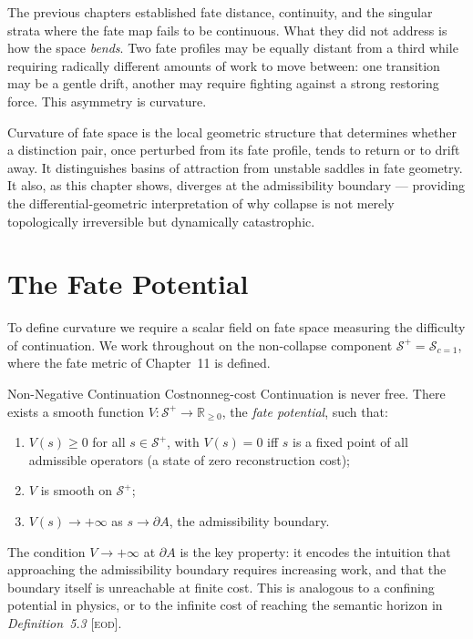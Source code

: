 \documentclass[12pt,twoside,openright]{book}
\newcommand{\fateSpace}{\mathcal{S}}
\newcommand{\collapseInd}{c}             %
\newcommand{\EOD}[1]{\textit{#1} [\textsc{eod}]}
\newcommand{\admRegion}{A}
\newcommand{\fateComp}[1]{\fateSpace_{\collapseInd=#1}}
\providecommand{\fatePos}{\fateSpace^{+}}
\providecommand{\fateComp}[1]{\fateSpace_{\collapseInd=#1}}
\providecommand{\admRegion}{A}
\providecommand{\fatePot}{V}
\begin{document}
The previous chapters established fate distance, continuity,
and the singular strata where the fate map fails to be
continuous. What they did not address is how the space
\emph{bends}. Two fate profiles may be equally distant from
a third while requiring radically different amounts of work
to move between: one transition may be a gentle drift, another
may require fighting against a strong restoring force. This
asymmetry is curvature.

Curvature of fate space is the local geometric structure that
determines whether a distinction pair, once perturbed from its
fate profile, tends to return or to drift away. It distinguishes
basins of attraction from unstable saddles in fate geometry.
It also, as this chapter shows, diverges at the admissibility
boundary --- providing the differential-geometric interpretation
of why collapse is not merely topologically irreversible but
dynamically catastrophic.

\section{The Fate Potential}

To define curvature we require a scalar field on fate space
measuring the difficulty of continuation. We work throughout
on the non-collapse component $\fatePos = \fateComp{1}$,
where the fate metric of Chapter~11 is defined.

\begin{axiom}{Non-Negative Continuation Cost}{nonneg-cost}
Continuation is never free. There exists a smooth function
$\fatePot:\fatePos\to\mathbb{R}_{\ge 0}$, the
\emph{fate potential}, such that:
\begin{enumerate}[nosep,label=(\roman*)]
  \item $\fatePot(s)\ge 0$ for all $s\in\fatePos$, with
    $\fatePot(s)=0$ iff $s$ is a fixed point of all admissible
    operators (a state of zero reconstruction cost);
  \item $\fatePot$ is smooth on $\fatePos$;
  \item $\fatePot(s)\to+\infty$ as $s\to\partial\admRegion$,
    the admissibility boundary.
\end{enumerate}
\end{axiom}

The condition $\fatePot\to+\infty$ at $\partial\admRegion$ is
the key property: it encodes the intuition that approaching the
admissibility boundary requires increasing work, and that the
boundary itself is unreachable at finite cost. This is analogous
to a confining potential in physics, or to the infinite cost of
reaching the semantic horizon in \EOD{Definition~5.3}.
\end{document}
